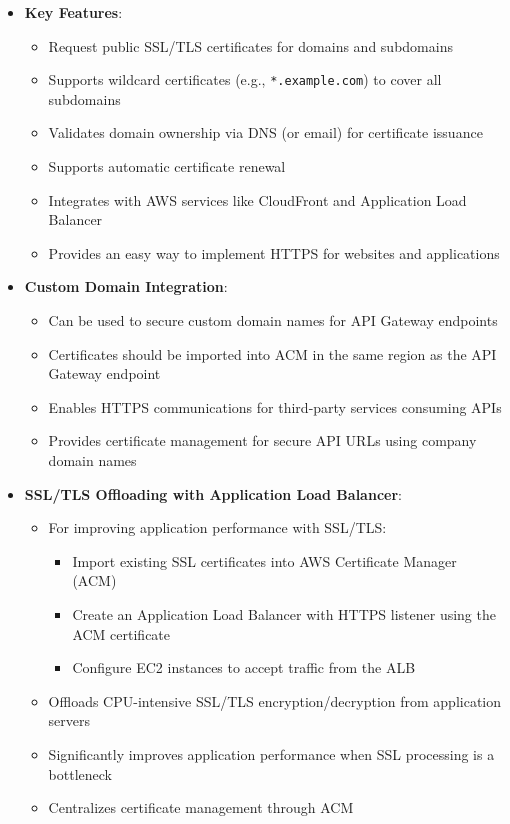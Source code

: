 \documentclass[11pt,a4paper]{report}
\begin{document}
\begin{itemize}
  \item \textbf{Key Features}:
\begin{itemize}
  \item Request public SSL/TLS certificates for domains and subdomains
  \item Supports wildcard certificates (e.g., \texttt{*.example.com}) to cover all subdomains
  \item Validates domain ownership via DNS (or email) for certificate issuance
  \item Supports automatic certificate renewal
  \item Integrates with AWS services like CloudFront and Application Load Balancer
  \item Provides an easy way to implement HTTPS for websites and applications
\end{itemize}
  \item \textbf{Custom Domain Integration}:
\begin{itemize}
  \item Can be used to secure custom domain names for API Gateway endpoints
  \item Certificates should be imported into ACM in the same region as the API Gateway endpoint
  \item Enables HTTPS communications for third-party services consuming APIs
  \item Provides certificate management for secure API URLs using company domain names
\end{itemize}
  \item \textbf{SSL/TLS Offloading with Application Load Balancer}:
\begin{itemize}
  \item For improving application performance with SSL/TLS:
\begin{itemize}
  \item Import existing SSL certificates into AWS Certificate Manager (ACM)
  \item Create an Application Load Balancer with HTTPS listener using the ACM certificate
  \item Configure EC2 instances to accept traffic from the ALB
\end{itemize}
  \item Offloads CPU-intensive SSL/TLS encryption/decryption from application servers
  \item Significantly improves application performance when SSL processing is a bottleneck
  \item Centralizes certificate management through ACM

\end{itemize}
\end{itemize}
\end{document}
